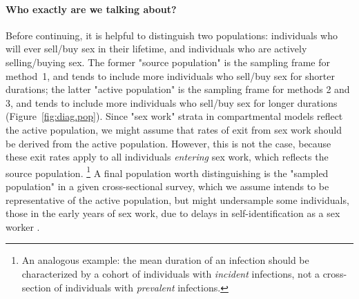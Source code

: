 \paragraph{Who exactly are we talking about?}
Before continuing, it is helpful to distinguish two populations:
individuals who will ever sell/buy sex in their lifetime, and
individuals who are actively selling/buying sex.
The former "source population" is the sampling frame for method~1,
and tends to include more individuals who sell/buy sex for shorter durations;
the latter "active population" is the sampling frame for methods 2 and 3,
and tends to include more individuals who sell/buy sex for longer durations
(Figure~\ref{fig:diag.pop}).
Since "sex work" strata in compartmental models reflect the active population,
we might assume that rates of exit from sex work
should be derived from the active population.
However, this is not the case, because
these exit rates apply to all individuals \emph{entering} sex work,
which reflects the source population.%
\footnote{An analogous example: %
  the mean duration of an infection should be characterized by
  a cohort of individuals with \emph{incident} infections,
  not a cross-section of individuals with \emph{prevalent} infections.}
A final population worth distinguishing is
the "sampled population" in a given cross-sectional survey,
which we assume intends to be representative of the active population,
but might undersample some individuals,
\eg those in the early years of sex work,
due to delays in self-identification as a sex worker
\cite{Mishra2012,Cheuk2020}.
